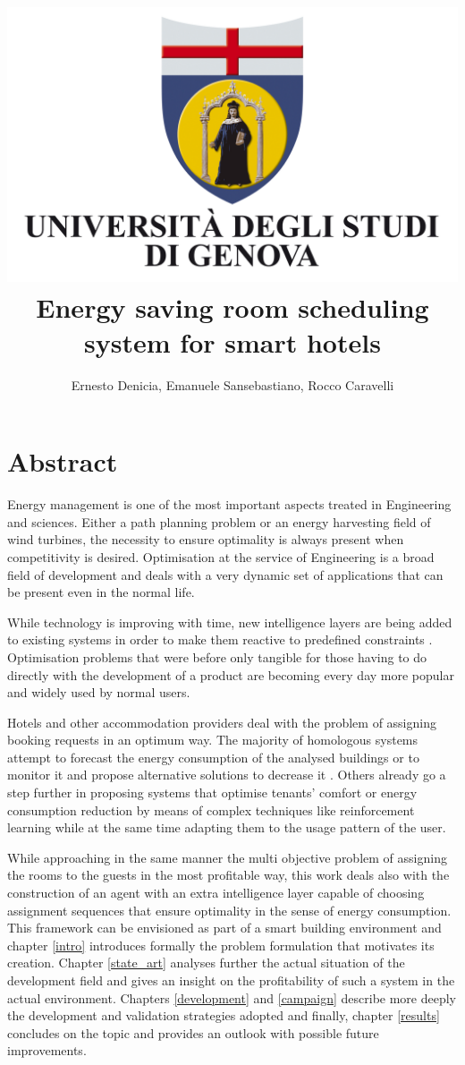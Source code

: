 \documentclass[letterpaper, 10 pt, conference]{ieeeconf}
\title{\includegraphics[scale = 0.05]{img/logo_unige.jpeg} \\ Energy saving room scheduling system for smart hotels}
\author{Ernesto Denicia, Emanuele Sansebastiano, Rocco Caravelli}
\begin{document}
		

\maketitle

\small

\section{Abstract}
Energy management is one of the most important aspects treated in Engineering and sciences. Either a path planning problem or an energy harvesting field of wind turbines, the necessity to ensure optimality is always present when competitivity is desired. Optimisation at the service of Engineering is a broad field of development and deals with a very dynamic set of applications that can be present even in the normal life.

While technology is improving with time, new intelligence layers are being added to existing systems in order to make them reactive to predefined constraints \cite{intelligent_decisions}. Optimisation problems that were before only tangible for those having to do directly with the development of a product are becoming every day more popular and widely used by normal users.

Hotels and other accommodation providers deal with the problem of assigning booking requests in an optimum way. The majority of homologous systems attempt to forecast the energy consumption of the analysed buildings or to monitor it and propose alternative solutions to decrease it \cite{university}. Others already go a step further in proposing systems that optimise tenants' comfort or energy consumption reduction by means of complex techniques like reinforcement learning \cite{reinf_learn} while at the same time adapting them to the usage pattern of the user.

While approaching in the same manner the multi objective problem of assigning the rooms to the guests in the most profitable way, this work deals also with the construction of an agent with an extra intelligence layer capable of choosing assignment sequences that ensure optimality in the sense of energy consumption. This framework can be envisioned as part of a smart building environment and chapter \ref{intro} introduces formally the problem formulation that motivates its creation. Chapter \ref{state_art} analyses further the actual situation of the development field and gives an insight on the profitability of such a system in the actual environment. Chapters \ref{development} and \ref{campaign} describe more deeply the development and validation strategies adopted and finally, chapter \ref{results} concludes on the topic and provides an outlook with possible future improvements.
\end{document}
